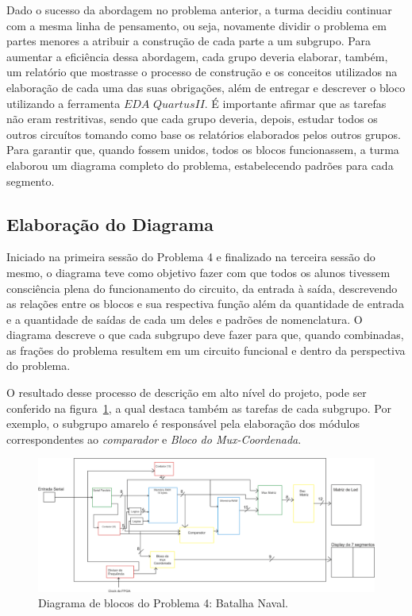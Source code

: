 \documentclass[12pt]{article}
\begin{document}
Dado o sucesso da abordagem no problema anterior, a turma decidiu continuar com a mesma linha de pensamento, ou seja, novamente dividir o problema em partes menores a atribuir a construção de cada parte a um subgrupo. Para aumentar a eficiência dessa abordagem, cada grupo deveria elaborar, também, um relatório que mostrasse o processo de construção e os conceitos utilizados na elaboração de cada uma das suas obrigações, além de entregar e descrever o bloco utilizando a ferramenta $EDA$ $Quartus II$. É importante afirmar que as tarefas não eram restritivas, sendo que cada grupo deveria, depois, estudar todos os outros circuítos tomando como base os relatórios elaborados pelos outros grupos. Para garantir que, quando fossem unidos, todos os blocos funcionassem, a turma elaborou um diagrama completo do problema, estabelecendo padrões para cada segmento.

\subsection{Elaboração do Diagrama}
Iniciado na primeira sessão do Problema 4 e finalizado na terceira sessão do mesmo, o diagrama teve como objetivo fazer com que todos os alunos tivessem consciência plena do funcionamento do circuito, da entrada à saída, descrevendo as relações entre os blocos e sua respectiva função além da quantidade de entrada e a quantidade de saídas de cada um deles e padrões de nomenclatura. O diagrama descreve o que cada subgrupo deve fazer para que, quando combinadas, as frações do problema resultem em um circuito funcional e dentro da perspectiva do problema. 

O resultado desse processo de descrição em alto nível do projeto, pode ser conferido na figura~\ref{fig:diagrama}, a qual destaca também as tarefas de cada subgrupo. Por exemplo, o subgrupo amarelo é responsável pela elaboração dos módulos correspondentes ao \textit{comparador} e \textit{Bloco do Mux-Coordenada}.

\begin{figure}[h]
\centering
\includegraphics[width=1\textwidth]{img/diagrama.png}
\caption{Diagrama de blocos do Problema 4: Batalha Naval.}
\label{fig:diagrama}
\end{figure}
\end{document}
